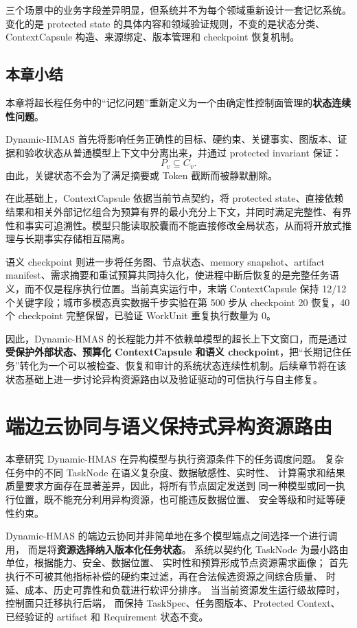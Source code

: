 \documentclass[UTF8,a4paper,12pt,oneside]{ctexbook}
\begin{document}
三个场景中的业务字段差异明显，但系统并不为每个领域重新设计一套记忆系统。变化的是 protected state 的具体内容和领域验证规则，不变的是状态分类、ContextCapsule 构造、来源绑定、版本管理和 checkpoint 恢复机制。


\section{本章小结}

本章将超长程任务中的“记忆问题”重新定义为一个由确定性控制面管理的\textbf{状态连续性问题}。

Dynamic-HMAS 首先将影响任务正确性的目标、硬约束、关键事实、图版本、证据和验收状态从普通模型上下文中分离出来，并通过 protected invariant 保证：
\[
P_v\subseteq C_v.
\]
由此，关键状态不会为了满足摘要或 Token 截断而被静默删除。

在此基础上，ContextCapsule 依据当前节点契约，将 protected state、直接依赖结果和相关外部记忆组合为预算有界的最小充分上下文，并同时满足完整性、有界性和事实可追溯性。模型只能读取胶囊而不能直接修改全局状态，从而将开放式推理与长期事实存储相互隔离。

语义 checkpoint 则进一步将任务图、节点状态、memory snapshot、artifact manifest、需求摘要和重试预算共同持久化，使进程中断后恢复的是完整任务语义，而不仅是程序执行位置。当前真实运行中，末端 ContextCapsule 保持 12/12 个关键字段；城市多模态真实数据千步实验在第 500 步从 checkpoint 20 恢复，40 个 checkpoint 完整保留，已验证 WorkUnit 重复执行数量为 0。

因此，Dynamic-HMAS 的长程能力并不依赖单模型的超长上下文窗口，而是通过\textbf{受保护外部状态、预算化 ContextCapsule 和语义 checkpoint}，把“长期记住任务”转化为一个可以被检查、恢复和审计的系统状态连续性机制。后续章节将在该状态基础上进一步讨论异构资源路由以及验证驱动的可信执行与自主修复。


\chapter{端边云协同与语义保持式异构资源路由}

本章研究 Dynamic-HMAS 在异构模型与执行资源条件下的任务调度问题。
复杂任务中的不同 TaskNode 在语义复杂度、数据敏感性、实时性、
计算需求和结果质量要求方面存在显著差异，因此，将所有节点固定发送到
同一种模型或同一执行位置，既不能充分利用异构资源，也可能违反数据位置、
安全等级和时延等硬性约束。

Dynamic-HMAS 的端边云协同并非简单地在多个模型端点之间选择一个进行调用，
而是将\textbf{资源选择纳入版本化任务状态}。
系统以契约化 TaskNode 为最小路由单位，根据能力、安全、数据位置、
实时性和预算形成节点资源需求画像；
首先执行不可被其他指标补偿的硬约束过滤，再在合法候选资源之间综合质量、
时延、成本、历史可靠性和负载进行软评分排序。
当当前资源发生运行级故障时，控制面只迁移执行后端，
而保持 TaskSpec、任务图版本、Protected Context、
已经验证的 artifact 和 Requirement 状态不变。
\end{document}
